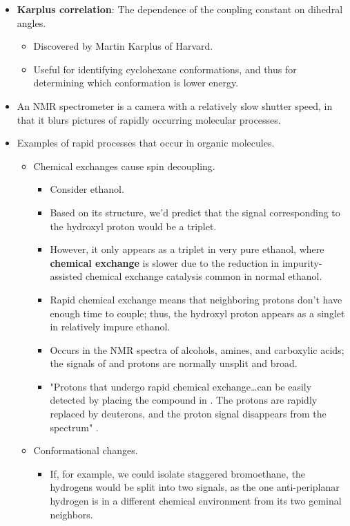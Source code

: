 \documentclass[../notes.tex]{subfiles}
\begin{document}
\begin{itemize}
    \item \textbf{Karplus correlation}: The dependence of the coupling constant on dihedral angles.
    \begin{itemize}
        \item Discovered by Martin Karplus of Harvard.
        \item Useful for identifying cyclohexane conformations, and thus for determining which conformation is lower energy.
    \end{itemize}
    \item An NMR spectrometer is a camera with a relatively slow shutter speed, in that it blurs pictures of rapidly occurring molecular processes.
    \item Examples of rapid processes that occur in organic molecules.
    \begin{itemize}
        \item Chemical exchanges cause spin decoupling.
        \begin{itemize}
            \item Consider ethanol.
            \item Based on its structure, we'd predict that the signal corresponding to the hydroxyl proton would be a triplet.
            \item However, it only appears as a triplet in very pure ethanol, where \textbf{chemical exchange} is slower due to the reduction in impurity-assisted chemical exchange catalysis common in normal ethanol.
            \item Rapid chemical exchange means that neighboring protons don't have enough time to couple; thus, the hydroxyl proton appears as a singlet in relatively impure ethanol.
            \item Occurs in the  NMR spectra of alcohols, amines, and carboxylic acids; the signals of  and  protons are normally unsplit and broad.
            \item "Protons that undergo rapid chemical exchange\dots can be easily detected by placing the compound in . The protons are rapidly replaced by deuterons, and the proton signal disappears from the spectrum" \parencite[413]{bib:SolomonsEtAl}.
        \end{itemize}
        \item Conformational changes.
        \begin{itemize}
            \item If, for example, we could isolate staggered bromoethane, the  hydrogens would be split into two signals, as the one anti-periplanar hydrogen is in a different chemical environment from its two geminal neighbors.

\end{itemize}
\end{itemize}
\end{itemize}
\end{document}
